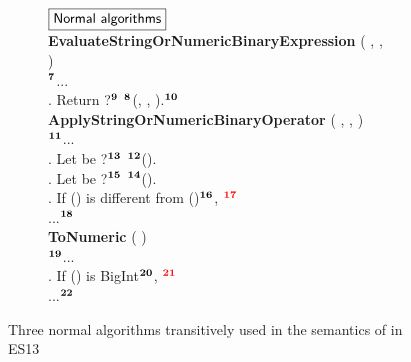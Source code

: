 \begin{figure}
  \centering
  \begin{subfigure}{\textwidth}
    \small
    $\fbox{\textsf{Normal algorithms}}$
    \vspace*{0.5em}\\
    \textbf{EvaluateStringOrNumericBinaryExpression} (
      ,
      ,
    )
    \\
    \null\quad ${}^{\textbf{7}}$...
    \\
    \null{}. Return ?${}^{\textbf{9}}$
    ${}^{\textbf{8}}$(,
    , ).${}^{\textbf{10}}$
    \vspace*{0.5em}\\
    \textbf{ApplyStringOrNumericBinaryOperator} (
      ,
      ,
    )
    \\
    \null\quad ${}^{\textbf{11}}$...
    \\
    \null{}. Let  be ?${}^{\textbf{13}}$
    ${}^{\textbf{12}}$().
    \\
    \null{}. Let  be ?${}^{\textbf{15}}$
    ${}^{\textbf{14}}$().
    \\
    \null{}. If () is different from
    ()${}^{\textbf{16}}$, ${}^{\textbf{{\color{red}{17}}}}$
    \\
    \null\quad ...${}^{\textbf{18}}$
    \vspace*{0.5em}\\
    \textbf{ToNumeric} (  )
    \\
    \null\quad ${}^{\textbf{19}}$...
    \\
    \null{}. If () is BigInt${}^{\textbf{20}}$,
    ${}^{\textbf{{\color{red}{21}}}}$
    \\
    \null\quad ...${}^{\textbf{22}}$
  \end{subfigure}
\vspace*{-1.5em}
  \caption{Three normal algorithms transitively used in the semantics of
   in ES13}
  \label{fig:normal-algos}
\end{figure}

